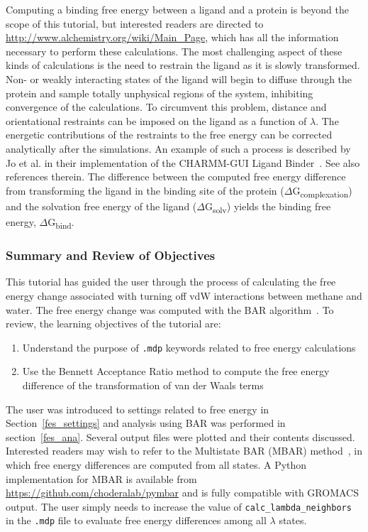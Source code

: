 \documentclass[9pt,tutorial]{livecoms}
\begin{document}
Computing a binding free energy between a ligand and a protein is beyond the scope of this tutorial, but interested readers are directed to \url{http://www.alchemistry.org/wiki/Main_Page}, which has all the information necessary to perform these calculations. The most challenging aspect of these kinds of calculations is the need to restrain the ligand as it is slowly transformed. Non- or weakly interacting states of the ligand will begin to diffuse through the protein and sample totally unphysical regions of the system, inhibiting convergence of the calculations. To circumvent this problem, distance and orientational restraints can be imposed on the ligand as a function of $\lambda$. The energetic contributions of the restraints to the free energy can be corrected analytically after the simulations. An example of such a process is described by Jo et al. in their implementation of the CHARMM-GUI Ligand Binder~\cite{Jo2012}. See also references therein. The difference between the computed free energy difference from transforming the ligand in the binding site of the protein ($\Delta$G\textsubscript{complexation}) and the solvation free energy of the ligand ($\Delta$G\textsubscript{solv}) yields the binding free energy, $\Delta$G\textsubscript{bind}.

\subsubsection{Summary and Review of Objectives} \label{fes_summary}

This tutorial has guided the user through the process of calculating the free energy change associated with turning off vdW interactions between methane and water. The free energy change was computed with the BAR algorithm~\cite{Bennett1976}. To review, the learning objectives of the tutorial are:

\begin{enumerate}
	\item Understand the purpose of \texttt{.mdp} keywords related to free energy calculations
	\item Use the Bennett Acceptance Ratio method to compute the free energy difference of the transformation of van der Waals terms
\end{enumerate}

The user was introduced to settings related to free energy in Section~\ref{fes_settings} and analysis using BAR was performed in section~\ref{fes_ana}. Several output files were plotted and their contents discussed. Interested readers may wish to refer to the Multistate BAR (MBAR) method~\cite{Shirts2008}, in which free energy differences are computed from all states. A Python implementation for MBAR is available from \url{https://github.com/choderalab/pymbar} and is fully compatible with GROMACS output. The user simply needs to increase the value of \texttt{calc\_lambda\_neighbors} in the \texttt{.mdp} file to evaluate free energy differences among all $\lambda$ states.
\end{document}
